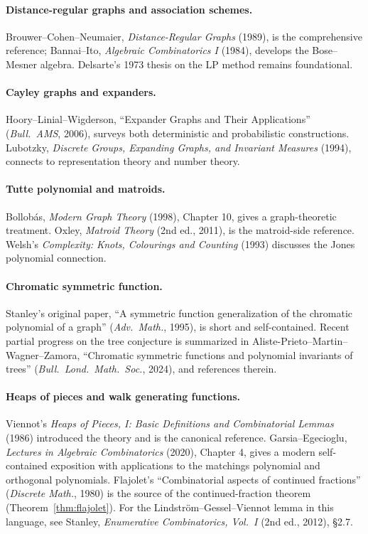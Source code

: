 \paragraph{Distance-regular graphs and association schemes.}
Brouwer--Cohen--Neumaier, \emph{Distance-Regular Graphs} (1989), is
the comprehensive reference; Bannai--Ito, \emph{Algebraic
Combinatorics I} (1984), develops the Bose--Mesner algebra. Delsarte's
1973 thesis on the LP method remains foundational.

\paragraph{Cayley graphs and expanders.} Hoory--Linial--Wigderson,
``Expander Graphs and Their Applications'' (\emph{Bull.\ AMS}, 2006),
surveys both deterministic and probabilistic constructions. Lubotzky,
\emph{Discrete Groups, Expanding Graphs, and Invariant Measures}
(1994), connects to representation theory and number theory.

\paragraph{Tutte polynomial and matroids.} Bollob\'as,
\emph{Modern Graph Theory} (1998), Chapter 10, gives a graph-theoretic
treatment. Oxley, \emph{Matroid Theory} (2nd ed., 2011), is the
matroid-side reference. Welsh's
\emph{Complexity: Knots, Colourings and Counting} (1993) discusses
the Jones polynomial connection.

\paragraph{Chromatic symmetric function.} Stanley's original paper,
``A symmetric function generalization of the chromatic polynomial of
a graph'' (\emph{Adv.\ Math.}, 1995), is short and self-contained.
Recent partial progress on the tree conjecture is summarized in
Aliste-Prieto--Martin--Wagner--Zamora, ``Chromatic symmetric functions
and polynomial invariants of trees'' (\emph{Bull.\ Lond.\ Math.\ Soc.},
2024), and references therein.

\paragraph{Heaps of pieces and walk generating functions.} Viennot's
\emph{Heaps of Pieces, I: Basic Definitions and Combinatorial
Lemmas} (1986) introduced the theory and is the canonical reference.
Garsia--Egecioglu, \emph{Lectures in Algebraic Combinatorics} (2020),
Chapter 4, gives a modern self-contained exposition with applications
to the matchings polynomial and orthogonal polynomials. Flajolet's
``Combinatorial aspects of continued fractions'' (\emph{Discrete
Math.}, 1980) is the source of the continued-fraction theorem
(Theorem~\ref{thm:flajolet}). For the Lindstr\"om--Gessel--Viennot
lemma in this language, see Stanley, \emph{Enumerative Combinatorics,
Vol.\ I} (2nd ed., 2012), \S 2.7.

